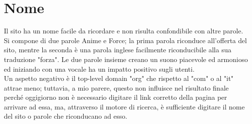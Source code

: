 \section{Nome} \label{Nome}
Il sito ha un nome facile da ricordare e non risulta confondibile con altre parole. Si compone di due parole Anime e Force; la prima parola riconduce all'offerta del sito, mentre la seconda è una parola inglese facilmente riconducibile alla sua traduzione "forza". Le due parole insieme creano un suono piacevole ed armonioso ed iniziando con una vocale ha un impatto positivo sugli utenti. \\
Un aspetto negativo è il top-level domain "org" che rispetto al "com" o al "it" attrae meno; tuttavia, a mio parere, questo non influisce nel risultato finale perché oggigiorno non è necessario digitare il link corretto della pagina per arrivare ad essa, ma, attraverso il motore di ricerca, è sufficiente digitare il nome del sito o parole che riconducano ad esso.